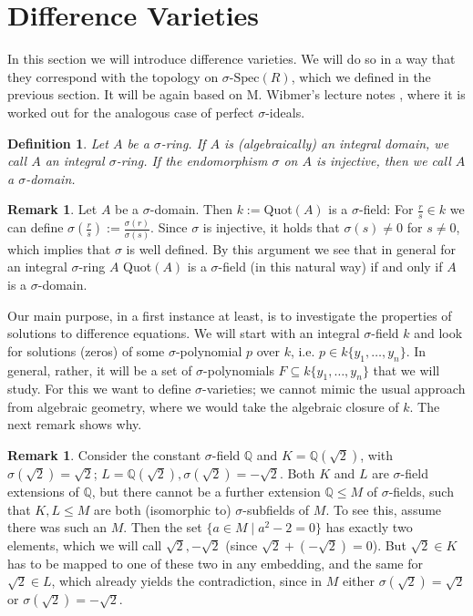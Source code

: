 \documentclass{article}
\def\Q{\mathbb{Q}}
\def\s{\sigma}
\def\sSpec{\sigma\text{-Spec}}
\theoremstyle{plain}
\newtheorem{defn}[Satz]{Definition}
\theoremstyle{definition}
\newtheorem{rem}[Satz]{Remark}
\begin{document}
\clearpage
\section{Difference Varieties}


In this section we will introduce difference varieties. We will do so in a way that they correspond with the topology on $\sSpec(R)$, which we defined in the previous section. It will be again based on M. Wibmer's lecture notes \cite{wibmer}, 
where it is worked out for the analogous case of perfect $\s$-ideals.

\begin{defn}
Let $A$ be a $\s$-ring. If $A$ is (algebraically) an integral domain, we call $A$ an \emph{integral $\s$-ring}. If the endomorphism $\s$ on $A$ is injective, then we call $A$ a \emph{$\s$-domain}. \index{integral $\s$-ring} \index{$\s$-domain}
\end{defn}

\begin{rem}\label{sdomain=field}
Let $A$ be a $\s$-domain. Then $k:=$Quot$(A)$ is a $\s$-field: For $\frac{r}{s} \in k$ we can define $\s(\frac{r}{s}):= \frac{\s(r)}{\s(s)}$. Since $\s$ is injective, it holds that $\s(s) \neq 0$ for $s \neq 0$, which implies that $\s$ is well defined.
By this argument we see that in general for an integral $\s$-ring $A$ Quot$(A)$ is a $\s$-field (in this natural way) if and only if $A$ is a $\s$-domain.
\end{rem}

Our main purpose, in a first instance at least, is to investigate the properties of solutions to difference equations. 
We will start with an integral $\s$-field $k$ and look for solutions (zeros) of some $\s$-polynomial $p$ over $k$, i.e. $p \in k\{y_1, \ldots, y_n \}$. In general, rather, it will be a set of $\s$-polynomials $F \subseteq k\{y_1, \ldots, y_n \}$ that we will study. 
For this we want to define $\s$-varieties; we cannot mimic the usual approach from algebraic geometry, where we would take the algebraic closure of $k$. The next remark shows why.

\begin{rem}\label{incompatibleextensions}
 Consider the constant $\s$-field $\Q$ and $K = \Q(\sqrt{2})$, with $\s (\sqrt{2}) = \sqrt{2}$; $L = \Q(\sqrt{2}), \s(\sqrt{2}) = - \sqrt{2}$. 
Both $K$ and $L$ are $\s$-field extensions of $\Q$, but there cannot be a further extension $\Q \leq M$ of $\s$-fields, such that $K,L \leq M$ are both (isomorphic to) $\s$-subfields of $M$. 
To see this, assume there was such an $M$. Then the set $\{ a \in M \mid a^2 - 2 = 0 \}$ has exactly two elements, which we will call $\sqrt{2}, -\sqrt{2}$ (since $\sqrt{2} + (- \sqrt{2}) = 0$).
But $\sqrt{2} \in K$ has to be mapped to one of these two in any embedding, and the same for $\sqrt{2} \in L$, which already yields the contradiction,
 since in $M$ either $\s(\sqrt{2}) = \sqrt{2}$ or $\s(\sqrt{2}) = -\sqrt{2}$.
\end{rem}
\end{document}
